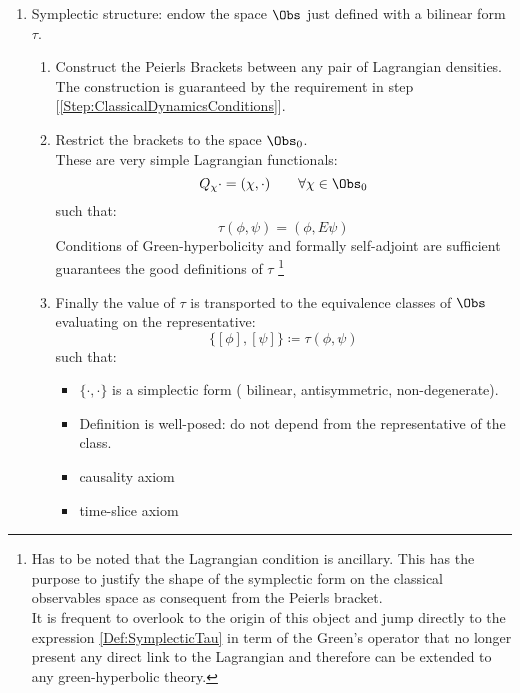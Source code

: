 \documentclass[Main]{subfiles}
\begin{document}
\begin{enumerate}
\begin{enumerate}
   				 \item Symplectic structure: endow the space $\Obs$ just defined with a bilinear form $\tau$.
   				   	\begin{enumerate}
   						\item Construct the Peierls Brackets between any pair of Lagrangian densities.\\
   							The construction is guaranteed by the requirement in step [\ref{Step:ClassicalDynamicsConditions}].
   						\item Restrict the brackets to the space $\Obs_0$.\\
   							These are very simple Lagrangian functionals:
   							\begin{displaymath}
   								Q_\chi \cdot = (\chi, \cdot) \qquad \forall \chi \in \Obs_0
   							\end{displaymath}
							such that:
							\begin{equation}\label{Def:SymplecticTau}
								\tau ( \phi, \psi) = ( \phi, E \psi)
							\end{equation}
							Conditions of Green-hyperbolicity and formally self-adjoint are sufficient guarantees the good definitions of $\tau$
							\footnote{Has to be noted that the Lagrangian condition is ancillary. This has the purpose to justify the shape of the symplectic form on the classical observables space as consequent from the Peierls bracket.
		\\
	It is frequent\cite{Dewitt1999}\cite{Benini} to overlook to the origin of this object and jump directly to the expression \ref{Def:SymplecticTau}  in term of the Green's operator that no longer present any direct link to the Lagrangian and therefore can be extended to any green-hyperbolic theory.}
						\item Finally the value of $\tau$ is transported to the equivalence classes of $\Obs$ evaluating on the representative:
							\begin{equation}
								\{ [\phi], [\psi]\} \coloneqq \tau(\phi, \psi)
							\end{equation}
							such that:
							\begin{itemize}
								\item $\{\cdot,\cdot\}$ is a simplectic form ( bilinear, antisymmetric, non-degenerate).
								\item Definition is well-posed: do not depend from the representative of the class.
								\item causality axiom
								\item time-slice axiom
							\end{itemize}
   					\end{enumerate}
   			\end{enumerate}
  

\end{enumerate}
\end{document}
